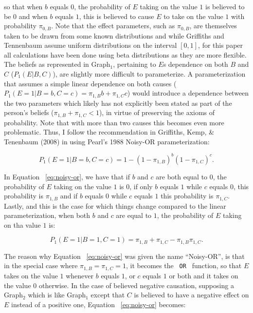 \documentclass[12pt]{article}
\begin{document}
so that when $b$ equals $0$, the probability of $E$ taking on the value $1$ is believed to be $0$ and when $b$ equals $1$, this is believed to cause $E$ to take on the value $1$ with probability $\pi_{0, B}$. Note that the effect parameters, such as $\pi_{0, B}$, are themselves taken to be drawn from some known distributions and while Griffiths and Tennenbaum assume uniform distributions on the interval $\left[0, 1\right]$, for this paper all calculations have been done using beta distributions as they are more flexible. The beliefs as represented in Graph$_1$, pertaining to $E$s dependence on both $B$ and $C$ ($P_1(E | B, C)$), are slightly more difficult to parameterize. A parameterization that assumes a simple linear dependence on both causes ($P_1(E=1 | B=b, C=c) = \pi_{1, B}b + \pi_{1, C}c$) would introduce a dependence between the two parameters which likely has not explicitly been stated as part of the person's beliefs ($\pi_{1, B} + \pi_{1, C} < 1$), in virtue of preserving the axioms of probability. Note that with more than two causes this becomes even more problematic. Thus, I follow the recommendation in Griffiths, Kemp, \& Tenenbaum (2008) in using Pearl's 1988 Noisy-OR parameterization:

\begin{equation} \label{eq:noisy-or}
P_1(E=1 | B=b, C=c) = 1- (1-\pi_{1, B})^b(1- \pi_{1, C})^c.
\end{equation}

In Equation ~\ref{eq:noisy-or}, we have that if $b$ and $c$ are both equal to $0$, the probability of $E$ taking on the value $1$ is $0$, if only $b$ equals $1$ while $c$ equals $0$, this probability is $\pi_{1, B}$ and if $b$ equals $0$ while $c$ equals $1$ this probability is $\pi_{1, C}$. Lastly, and this is the case for which things change compared to the linear parameterization, when both $b$ and $c$ are equal to $1$, the probability of $E$ taking on tha value $1$ is:

$$P_1(E=1 | B=1, C=1)= \pi_{1, B} + \pi_{1, C} - \pi_{1, B}\pi_{1, C}.$$

The reason why Equation ~\ref{eq:noisy-or} was given the name ``Noisy-OR'', is that in the special case where $\pi_{1, B}=\pi_{1, C}=1$, it becomes the \verb| OR | function, so that $E$ takes on the value $1$ whenever $b$ equals $1$, or $c$ equals $1$ or both and it takes on the value $0$ otherwise. In the case of believed negative causation, supposing a Graph$_2$ which is like Graph$_1$ except that $C$ is believed to have a negative effect on $E$ instead of a positive one, Equation ~\ref{eq:noisy-or} becomes:
\end{document}
